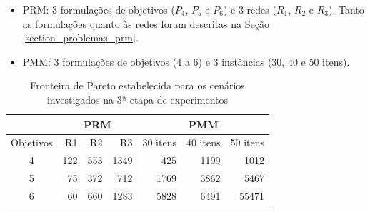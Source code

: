 \begin{itemize}
	\item PRM: 3 formulações de objetivos ($P_4$, $P_5$ e $P_6$) e 3 redes ($R_1$, $R_2$ e $R_3$). Tanto as formulações quanto às redes foram descritas na Seção \ref{section_problemas_prm}.
	\item PMM: 3 formulações de objetivos (4 a 6) e 3 instâncias (30, 40 e 50 itens).
\end{itemize}


\begin{table}[!htbp]
	\centering
	\caption{Fronteira de Pareto estabelecida para os cenários investigados na 3ª etapa de experimentos}
	\label{table_exp3_paretos}
	\begin{tabular}{c|rrr|rrr}
		& \multicolumn{3}{c|}{\textbf{PRM}} & \multicolumn{3}{c}{\textbf{PMM}} \\ \hline
		Objetivos & R1         & R2       & R3        & 30 itens  & 40 itens & 50 itens \\ \hline
		4         & 122        & 553       & 1349        & 425       & 1199      & 1012    \\
		5         & 75        & 372      & 712       & 1769      & 3862     & 5467   \\
		6         & 60       & 660      & 1283      & 5828      & 6491   & 55471   \\ \hline
	\end{tabular}
\end{table}

